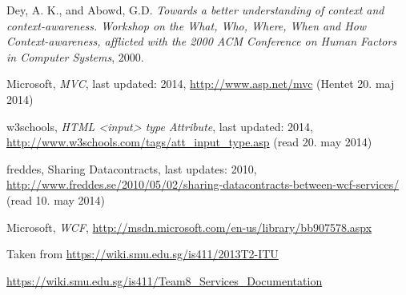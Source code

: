 \documentclass[../report.tex]{subfiles}
\begin{document}
\graphicspath{{img/}{../img/}}
\begingroup
\renewcommand{\chapter}[2]{}%
\begin{thebibliography}{}

  Dey, A. K., and Abowd, G.D.
  \emph{Towards a better understanding of context and context-awareness. Workshop on the What, Who, Where, When and How Context-awareness, afflicted with the 2000 ACM Conference on Human Factors in Computer Systems},
  2000. 

Microsoft, \textit{MVC}, last updated: 2014, \url{http://www.asp.net/mvc} (Hentet  20. maj 2014)

w3schools, \textit{HTML <input> type Attribute}, last updated: 2014,  \url{http://www.w3schools.com/tags/att\_input\_type.asp} (read 20. may 2014)

freddes, Sharing Datacontracts, last updates: 2010, \url{http://www.freddes.se/2010/05/02/sharing-datacontracts-between-wcf-services/} (read 10. may 2014)

Microsoft, \textit{WCF}, \url{http://msdn.microsoft.com/en-us/library/bb907578.aspx}

Taken from \url{https://wiki.smu.edu.sg/is411/2013T2-ITU}

\url{https://wiki.smu.edu.sg/is411/Team8\_Services\_Documentation}


\end{thebibliography}
\endgroup
\end{document}
